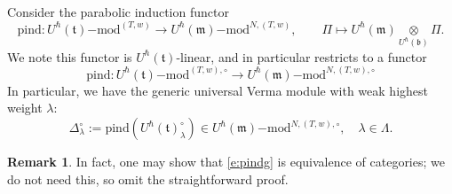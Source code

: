 \documentclass{amsart}
\theoremstyle{definition}
\newtheorem{Rem}[Thm]{Remark}
\newcommand{\fm}{\mathfrak{m}}
\newcommand{\fb}{\mathfrak{b}}
\newcommand{\lmod}{\on{-mod}}
\newcommand{\sss}{\subsubsection{}}
\newcommand{\ft}{\mathfrak{t}}
\newcommand{\on}{\mathrm}
\newcommand{\cM}{\Pi}
\numberwithin{equation}{section}
\begin{document}
\sss \label{s:hch} Consider the parabolic induction functor
$$\on{pind}: U^\hbar(\ft)\lmod^{(T,w)} \rightarrow U^\hbar(\fm)\lmod^{N, (T,w)}, \quad \quad \cM \mapsto U^\hbar(\fm) \underset{U^\hbar(\fb)} \otimes \cM.$$
We note this functor is $U^\hbar(\ft)$-linear, and in particular restricts to a functor
\begin{equation}
    \label{e:pindg} \on{pind}:  U^\hbar(\ft)\lmod^{(T,w), \circ} \rightarrow U^\hbar(\fm)\lmod^{N, (T,w), \circ} 
\end{equation}
In particular, we have the generic universal Verma module with weak highest weight $\lambda$:
\begin{equation}\label{eq:universal_Verma_defn}
\Delta_\lambda^\circ := \on{pind}(U^\hbar(\ft)_\lambda^\circ)\in U^\hbar(\fm)\lmod^{N,(T,w), \circ},  \quad \lambda \in \Lambda.
\end{equation}

\begin{Rem} In fact, one may show that \eqref{e:pindg} is equivalence of categories; we do not need this, so omit the straightforward proof. 
\end{Rem}
\end{document}
